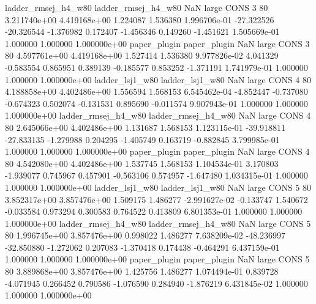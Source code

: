 ladder_rmsej_h4_w80 ladder_rmsej_h4_w80                   NaN      large     CONS                 3 80 3.211740e+00   4.419168e+00      1.224087       1.536380  1.996706e-01    -27.322526    -20.326544    -1.376982       0.172407 -1.456346   0.149260    -1.451621   1.505669e-01            1.000000        1.000000        1.000000e+00
       paper_plugin        paper_plugin                   NaN      large     CONS                 3 80 4.597761e+00   4.419168e+00      1.527414       1.536380  9.977826e-02      4.041329     -0.583554     0.865951       0.389139 -0.185577   0.853252    -1.371191   1.741979e-01            1.000000        1.000000        1.000000e+00
    ladder_lsj1_w80     ladder_lsj1_w80                   NaN      large     CONS                 4 80 4.188858e+00   4.402486e+00      1.556594       1.568153  6.545462e-04     -4.852447     -0.737080    -0.674323       0.502074 -0.131531   0.895690    -0.011574   9.907943e-01            1.000000        1.000000        1.000000e+00
ladder_rmsej_h4_w80 ladder_rmsej_h4_w80                   NaN      large     CONS                 4 80 2.645066e+00   4.402486e+00      1.131687       1.568153  1.123115e-01    -39.918811    -27.833135    -1.279988       0.204295 -1.405749   0.163719    -0.882845   3.799985e-01            1.000000        1.000000        1.000000e+00
       paper_plugin        paper_plugin                   NaN      large     CONS                 4 80 4.542080e+00   4.402486e+00      1.537745       1.568153  1.104534e-01      3.170803     -1.939077     0.745967       0.457901 -0.563106   0.574957    -1.647480   1.034315e-01            1.000000        1.000000        1.000000e+00
    ladder_lsj1_w80     ladder_lsj1_w80                   NaN      large     CONS                 5 80 3.852317e+00   3.857476e+00      1.509175       1.486277 -2.991627e-02     -0.133747      1.540672    -0.033584       0.973294  0.300583   0.764522     0.413809   6.801353e-01            1.000000        1.000000        1.000000e+00
ladder_rmsej_h4_w80 ladder_rmsej_h4_w80                   NaN      large     CONS                 5 80 1.996745e+00   3.857476e+00      0.998022       1.486277  7.638209e-02    -48.236997    -32.850880    -1.272062       0.207083 -1.370418   0.174438    -0.464291   6.437159e-01            1.000000        1.000000        1.000000e+00
       paper_plugin        paper_plugin                   NaN      large     CONS                 5 80 3.889868e+00   3.857476e+00      1.425756       1.486277  1.074494e-01      0.839728     -4.071945     0.266452       0.790586 -1.076590   0.284940    -1.876219   6.431845e-02            1.000000        1.000000        1.000000e+00
